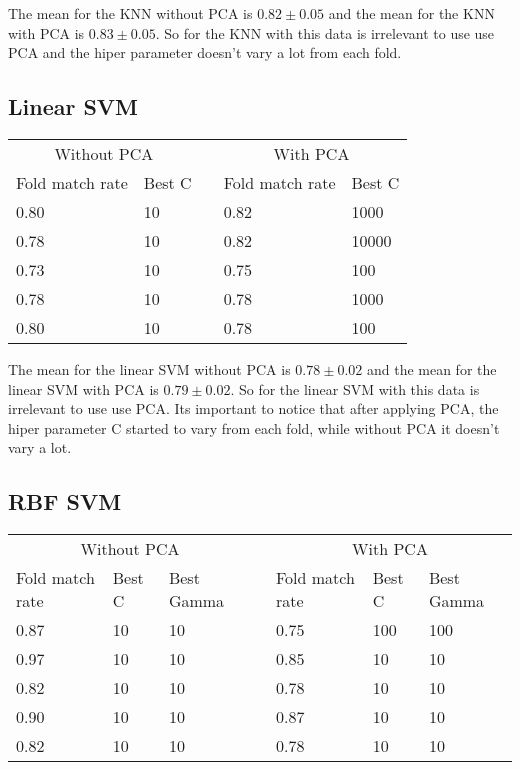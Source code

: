 \documentclass{article}
\begin{document}
The mean for the KNN without PCA is $0.82 \pm 0.05$ and the mean for the KNN with PCA is $0.83 \pm 0.05$. So for the KNN with this data is irrelevant to use use PCA and the hiper parameter doesn't vary a lot from each fold.

\subsection{Linear SVM}

\begin{table}[h]
    \begin{tabular}{|l|l|l|l|l|}
    \cline{1-2} \cline{4-5}
    \multicolumn{2}{|c|}{Without PCA} &  & \multicolumn{2}{|c|}{With PCA} \\ \cline{1-2} \cline{4-5}
    Fold match rate & Best C &  & Fold match rate & Best C  \\ \cline{1-2} \cline{4-5} 
    0.80 & 10 &  & 0.82 & 1000  \\ \cline{1-2} \cline{4-5} 
    0.78 & 10 &  & 0.82 & 10000  \\ \cline{1-2} \cline{4-5} 
    0.73 & 10 &  & 0.75 & 100  \\ \cline{1-2} \cline{4-5} 
    0.78 & 10 &  & 0.78 & 1000  \\ \cline{1-2} \cline{4-5} 
    0.80 & 10 &  & 0.78 & 100  \\ \cline{1-2} \cline{4-5}
    \end{tabular}
\end{table}

The mean for the linear SVM without PCA is $0.78 \pm 0.02$ and the mean for the linear SVM with PCA is $0.79 \pm 0.02$. So for the linear SVM with this data is irrelevant to use use PCA. Its important to notice that after applying PCA, the hiper parameter C started to vary from each fold, while without PCA it doesn't vary a lot.

\subsection{RBF SVM}

\begin{table}[h]
    \begin{tabular}{|l|l|l|l|l|l|l|}
    \cline{1-3} \cline{5-7}
    \multicolumn{3}{|c|}{Without PCA} &  & \multicolumn{3}{|c|}{With PCA} \\ \cline{1-3} \cline{5-7}
    Fold match rate & Best C & Best Gamma &  & Fold match rate & Best C & Best Gamma  \\ \cline{1-3} \cline{5-7}
    0.87 & 10 & 10 &  & 0.75 & 100 & 100   \\ \cline{1-3} \cline{5-7}
    0.97 & 10 & 10 &  & 0.85 & 10 & 10   \\ \cline{1-3} \cline{5-7}
    0.82 & 10 & 10 &  & 0.78 & 10 & 10   \\ \cline{1-3} \cline{5-7}
    0.90 & 10 & 10 &  & 0.87 & 10 & 10   \\ \cline{1-3} \cline{5-7}
    0.82 & 10 & 10 &  & 0.78 & 10 & 10   \\ \cline{1-3} \cline{5-7}
    \end{tabular}
\end{table}
\end{document}
